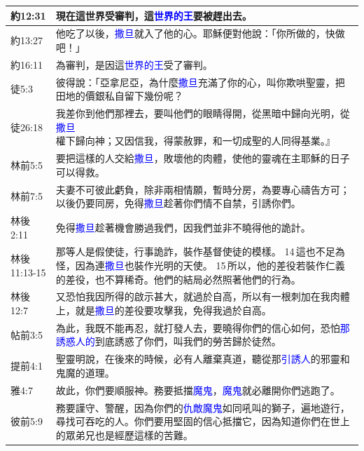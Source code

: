 \begin{table}[H]
\begin{tabular}{p{1.6cm}|p{}}
約12:31&現在這世界受審判，這\textcolor{blue}{世界的王}要被趕出去。\\\hline
  
約13:27&他吃了以後，\textcolor{blue}{撒旦}就入了他的心。耶穌便對他說：「你所做的，快做吧！」\\\hline

約16:11&為審判，是因這\textcolor{blue}{世界的王}受了審判。\\\hline

徒5:3&彼得說：「亞拿尼亞，為什麼\textcolor{blue}{撒旦}充滿了你的心，叫你欺哄聖靈，把田地的價銀私自留下幾份呢？\\\hline

徒26:18&我差你到他們那裡去，要叫他們的眼睛得開，從黑暗中歸向光明，從\textcolor{blue}{撒旦}權下歸向神；又因信我，得蒙赦罪，和一切成聖的人同得基業。』\\\hline

林前5:5&要把這樣的人交給\textcolor{blue}{撒旦}，敗壞他的肉體，使他的靈魂在主耶穌的日子可以得救。\\\hline
林前7:5&夫妻不可彼此虧負，除非兩相情願，暫時分房，為要專心禱告方可；以後仍要同房，免得\textcolor{blue}{撒旦}趁著你們情不自禁，引誘你們。\\\hline
林後2:11&免得\textcolor{blue}{撒旦}趁著機會勝過我們，因我們並非不曉得他的詭計。\\\hline

林後11:13-15&那等人是假使徒，行事詭詐，裝作基督使徒的模樣。 14 這也不足為怪，因為連\textcolor{blue}{撒旦}也裝作光明的天使。 15 所以，他的差役若裝作仁義的差役，也不算稀奇。他們的結局必然照著他們的行為。\\\hline

林後12:7&又恐怕我因所得的啟示甚大，就過於自高，所以有一根刺加在我肉體上，就是\textcolor{blue}{撒旦}的差役要攻擊我，免得我過於自高。\\\hline

帖前3:5&為此，我既不能再忍，就打發人去，要曉得你們的信心如何，恐怕\textcolor{blue}{那誘惑人的}到底誘惑了你們，叫我們的勞苦歸於徒然。\\\hline
提前4:1&聖靈明說，在後來的時候，必有人離棄真道，聽從那\textcolor{blue}{引誘人}的邪靈和鬼魔的道理。\\\hline

雅4:7&故此，你們要順服神。務要抵擋\textcolor{blue}{魔鬼}，\textcolor{blue}{魔鬼}就必離開你們逃跑了。\\\hline

彼前5:9&務要謹守、警醒，因為你們的\textcolor{blue}{仇敵魔鬼}如同吼叫的獅子，遍地遊行，尋找可吞吃的人。你們要用堅固的信心抵擋它，因為知道你們在世上的眾弟兄也是經歷這樣的苦難。\\\hline


\end{tabular}
\end{table}
